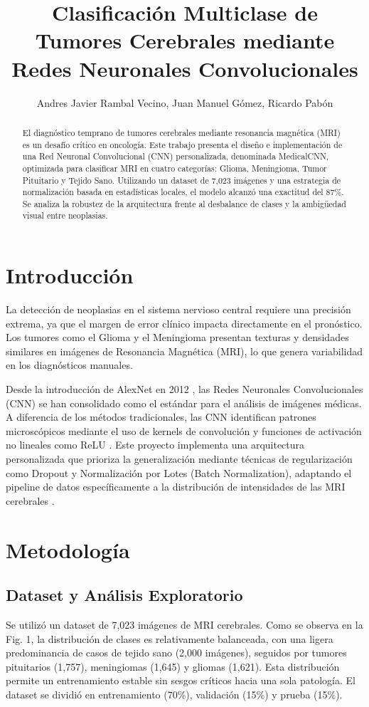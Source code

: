 \documentclass[letterpaper, 10 pt, conference]{ieeeconf}
\title{\LARGE \bf
Clasificación Multiclase de Tumores Cerebrales mediante Redes Neuronales Convolucionales
}
\author{
Andres Javier Rambal Vecino,
Juan Manuel Gómez,
Ricardo Pabón
}
\begin{document}
\maketitle
\thispagestyle{empty}
\pagestyle{empty}

\begin{abstract}
El diagnóstico temprano de tumores cerebrales mediante resonancia magnética (MRI) es un desafío crítico en oncología. Este trabajo presenta el diseño e implementación de una Red Neuronal Convolucional (CNN) personalizada, denominada MedicalCNN, optimizada para clasificar MRI en cuatro categorías: Glioma, Meningioma, Tumor Pituitario y Tejido Sano. Utilizando un dataset de 7,023 imágenes y una estrategia de normalización basada en estadísticas locales, el modelo alcanzó una exactitud del 87\%. Se analiza la robustez de la arquitectura frente al desbalance de clases y la ambigüedad visual entre neoplasias.
\end{abstract}

\section{Introducción}
La detección de neoplasias en el sistema nervioso central requiere una precisión extrema, ya que el margen de error clínico impacta directamente en el pronóstico. Los tumores como el Glioma y el Meningioma presentan texturas y densidades similares en imágenes de Resonancia Magnética (MRI), lo que genera variabilidad en los diagnósticos manuales.

Desde la introducción de AlexNet en 2012 \cite{c1}, las Redes Neuronales Convolucionales (CNN) se han consolidado como el estándar para el análisis de imágenes médicas. A diferencia de los métodos tradicionales, las CNN identifican patrones microscópicos mediante el uso de kernels de convolución y funciones de activación no lineales como ReLU \cite{c1}. Este proyecto implementa una arquitectura personalizada que prioriza la generalización mediante técnicas de regularización como Dropout y Normalización por Lotes (Batch Normalization), adaptando el pipeline de datos específicamente a la distribución de intensidades de las MRI cerebrales \cite{c2}.

\section{Metodología}

\subsection{Dataset y Análisis Exploratorio}
Se utilizó un dataset de 7,023 imágenes de MRI cerebrales. Como se observa en la Fig. 1, la distribución de clases es relativamente balanceada, con una ligera predominancia de casos de tejido sano (2,000 imágenes), seguidos por tumores pituitarios (1,757), meningiomas (1,645) y gliomas (1,621). Esta distribución permite un entrenamiento estable sin sesgos críticos hacia una sola patología. El dataset se dividió en entrenamiento (70\%), validación (15\%) y prueba (15\%).
\end{document}
